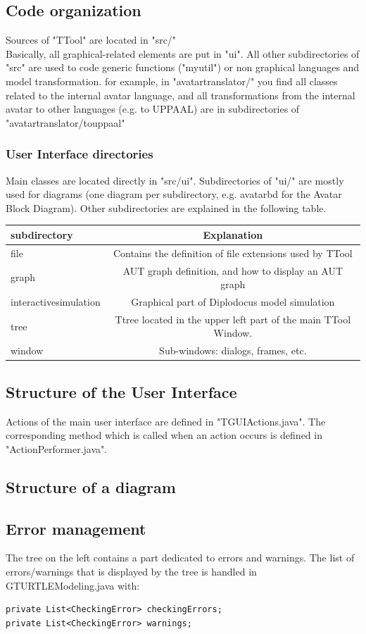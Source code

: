 \documentclass[12pt]{article}
\begin{document}
\subsection{Code organization}
Sources of "TTool" are located in "src/"\\
Basically, all graphical-related elements are put in "ui". All other subdirectories of "src" are used to code generic functions ("myutil") or non graphical languages and model transformation. for example, in "avatartranslator/" you find all classes related to the internal avatar language, and all transformations from the internal avatar to other languages (e.g. to UPPAAL) are in subdirectories of "avatartranslator/touppaal"
\subsubsection{User Interface directories}
Main classes are located directly in "src/ui". Subdirectories of "ui/" are mostly used for diagrams (one diagram per subdirectory, e.g. avatarbd for the Avatar Block Diagram). Other subdirectories are explained in the following table.
\begin{tabular}{l|c}
subdirectory&Explanation\\
\hline
file&Contains the definition of file extensions used by TTool\\
graph&AUT graph definition, and how to display an AUT graph\\
interactivesimulation&Graphical part of Diplodocus model simulation\\
tree&Ttree located in the upper left part of the main TTool Window.\\
window&Sub-windows: dialogs, frames, etc.
\end{tabular}

\subsection{Structure of the User Interface}
Actions of the main user interface are defined in "TGUIActions.java". The corresponding method which is called when an action occurs is defined in "ActionPerformer.java".

\subsection{Structure of a diagram}


\subsection{Error management}
The tree on the left contains a part dedicated to errors and warnings. The list of errors/warnings that is displayed by the tree is handled in GTURTLEModeling.java with:
\begin{lstlisting}
private List<CheckingError> checkingErrors;
private List<CheckingError> warnings;
\end{lstlisting}
\end{document}
